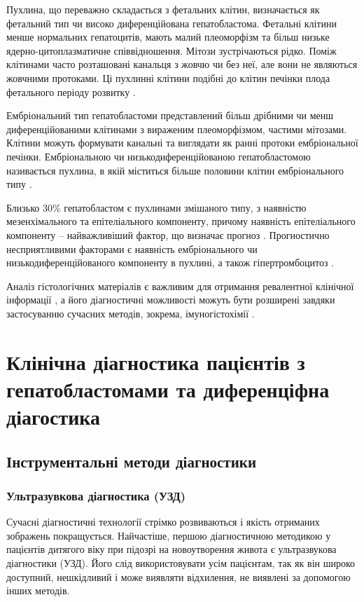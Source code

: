 Пухлина, що переважно складається з фетальних клітин, визначається як фетальний тип чи високо диференційована гепатобластома. Фетальні клітини менше нормальних гепатоцитів, мають малий плеоморфізм та більш низьке ядерно-цитоплазматичне співвідношення. Мітози зустрічаються рідко. Поміж клітинами часто розташовані канальця з жовчю чи без неї, але вони не являються жовчними протоками. Ці пухлинні клітини подібні до клітин печінки плода фетального періоду розвитку \cite{pmid16176410}.

Ембріональний тип гепатобластоми представлений більш дрібними чи менш диференційованими клітинами з вираженим плеоморфізмом, частими мітозами. Клітини можуть формувати канальні та виглядати як ранні протоки ембріональної печінки. Ембріональною чи низькодиференційованою гепатобластомою називається пухлина, в якій міститься більше половини клітин ембріонального типу \cite{pmid11792985}.

Близько 30\% гепатобластом є пухлинами змішаного типу, з наявністю мезенхімального та епітеліального компоненту, причому наявність епітеліального компоненту –  найважливіший фактор, що визначає прогноз \cite{pmid11819207}. Прогностично несприятливими факторами є наявність ембріонального чи низькодиференційованого компоненту в пухлині, а також  гіпертромбоцитоз \cite{pmid11792985} \cite{pmid28620649}.

Аналіз гістологічних матеріалів є важливим для отримання ревалентної клінічної інформації \cite{pmid25783395}, а його діагностичні можливості можуть бути розширені завдяки застосуванню сучасних методів, зокрема, імуногістохімії \cite{pmid25945430}.  

\section{Клінічна діагностика пацієнтів з гепатобластомами та диференціфна діагостика}
\subsection{Інструментальні методи діагностики}
\subsubsection{Ультразувкова діагностика (УЗД)} 

Сучасні діагностичні технології стрімко розвиваються і якість отриманих зображень покращується. Найчастіше, першою діагностичною методикою у пацієнтів дитягого віку при підозрі на новоутворення живота є ультразвукова діагностики (УЗД). Його слід використовувати усім пацієнтам, так як він широко доступний, нешкідливий і може виявляти відхилення, не виявлені за допомогою інших методів.

